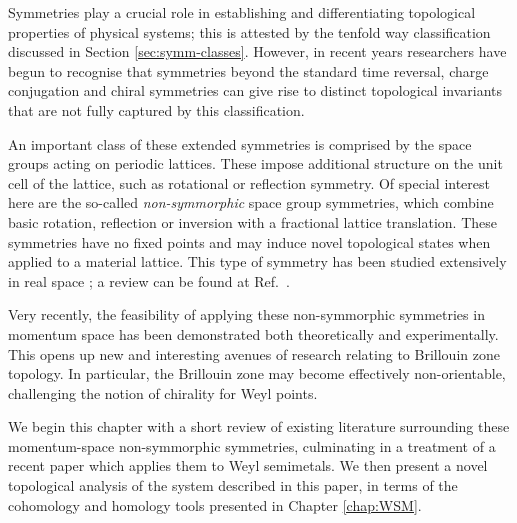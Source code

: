 \label{chap:non-orientable}

Symmetries play a crucial role in establishing and differentiating topological properties of physical systems; this is attested by the tenfold way classification discussed in Section \ref{sec:symm-classes}. However, in recent years researchers have begun to recognise that symmetries beyond the standard time reversal, charge conjugation and chiral symmetries can give rise to distinct topological invariants that are not fully captured by this classification.

An important class of these extended symmetries is comprised by the space groups acting on periodic lattices. These impose additional structure on the unit cell of the lattice, such as rotational or reflection symmetry. Of special interest here are the so-called \emph{non-symmorphic} space group symmetries, which combine basic rotation, reflection or inversion with a fractional lattice translation. These symmetries have no fixed points and may induce novel topological states when applied to a material lattice. This type of symmetry has been studied extensively in real space \cite{Wang_hourglass,Chen_nonsymmorphic-semimetal,Kim_glide-semimetal,Shiozaki_nonsymmorphic-topology,Bzdusek_nodal-chain,Wieder_layer-semimetal,Zhao_nonsymmorphic-semimetal,Yang_nonsymmorphic-semimetal,Wang_hourglass-semimetal,Wang_hourglass-Dirac,Wieder_wallpaper-fermions,Xiao_hourglass-Weyl}; a review can be found at Ref.~\cite{Zhang_nonsymmorphic-review}.

Very recently, the feasibility of applying these non-symmorphic symmetries in momentum space has been demonstrated both theoretically and experimentally. %
This opens up new and interesting avenues of research relating to Brillouin zone topology. In particular, the Brillouin zone may become effectively non-orientable, challenging the notion of chirality for Weyl points.

We begin this chapter with a short review of existing literature surrounding these momentum-space non-symmorphic symmetries, culminating in a treatment of a recent paper which applies them to Weyl semimetals. We then present a novel topological analysis of the system described in this paper, in terms of the cohomology and homology tools presented in Chapter \ref{chap:WSM}.



